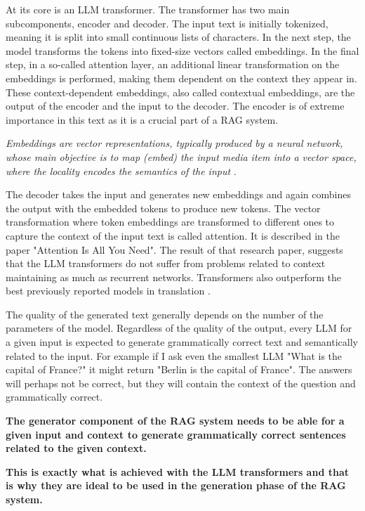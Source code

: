 \documentclass{wseas}
\begin{document}
At its core is an LLM transformer. The
transformer has two main subcomponents, encoder and decoder. The
input text is initially tokenized, meaning it is split into small
continuous lists of characters. In the next step, the model transforms
the tokens into fixed-size vectors called embeddings. In the final step,
in a so-called attention layer, an additional linear transformation on
the embeddings is performed, making them dependent on the context they
appear in. These context-dependent embeddings, also called contextual
embeddings, are the output of the encoder and the input to the decoder.
The encoder is of extreme importance in this text as it is a crucial
part of a RAG system.

\emph{Embeddings are vector representations, typically produced by a
neural network, whose main objective is to map (embed) the input media
item into a vector space, where the locality encodes the semantics of
the input} \cite{the_faiss_library}.


The decoder takes the input and generates new embeddings and again
combines the output with the embedded tokens to produce new tokens. The
vector transformation where token embeddings are transformed to
different ones to capture the context of the input text is called
attention. It is described in the paper "Attention Is All You Need". 
The result of that research paper, suggests that 
the LLM transformers do not suffer from problems related to context 
maintaining as much as recurrent networks. Transformers also outperform the 
best previously reported models in translation \cite{attention_is_all_you_need}.

The quality of the generated text generally depends on the number of the
parameters of the model. Regardless of the quality of the output, every
LLM for a given input is expected to generate grammatically correct text
and semantically related to the input. For example if I ask even the
smallest LLM "What is the capital of France?" it might return "Berlin
is the capital of France". The answers will perhaps not be correct, but
they will contain the context of the question and grammatically correct.

\textbf{The generator component of the RAG system needs to be able for
a given input and context to generate grammatically correct sentences
related to the given context.}

\textbf{This is exactly what is achieved with the LLM transformers and
that is why they are ideal to be used in the generation phase of the RAG
system.}
\end{document}
